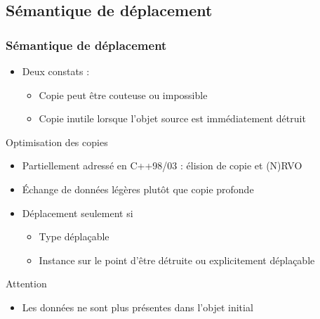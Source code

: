 \documentclass[C++.tex]{subfiles}
\begin{document}
\subsection*{Sémantique de déplacement}
\begin{frame}
	\frametitle{Sémantique de déplacement}
	\begin{itemize}
		\item Deux constats :
		\begin{itemize}
			\item Copie peut être couteuse ou impossible


			\item Copie inutile lorsque l'objet source est immédiatement détruit
		\end{itemize}
	\end{itemize}

	\begin{block}{Optimisation des copies}
		\begin{itemize}
			\item Partiellement adressé en C++98/03 : élision de copie et (N)RVO
		\end{itemize}

	\end{block}

	\begin{itemize}
		\item Échange de données légères plutôt que copie profonde
		\item Déplacement seulement si
		\begin{itemize}
			\item Type déplaçable
			\item Instance sur le point d'être détruite ou explicitement déplaçable
		\end{itemize}
	\end{itemize}

	\begin{alertblock}{Attention}
		\begin{itemize}
			\item Les données ne sont plus présentes dans l'objet initial
		\end{itemize}
	\end{alertblock}
\end{frame}
\end{document}

